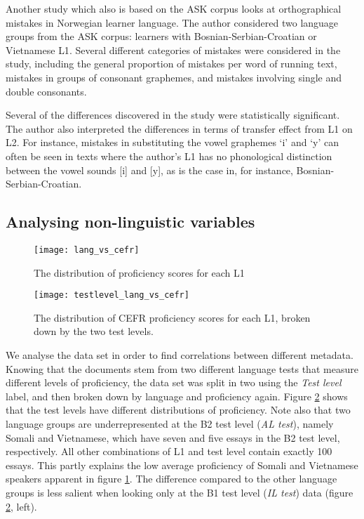 Another study \autocite{vigrestad2016} which also is based on the ASK corpus
looks at orthographical mistakes in Norwegian learner language. The author
considered two language groups from the ASK corpus: learners with
Bosnian-Serbian-Croatian or Vietnamese \ac{L1}. Several different categories
of mistakes were considered in the study, including the general proportion of
mistakes per word of running text, mistakes in groups of consonant graphemes,
and mistakes involving single and double consonants.

Several of the differences discovered in the study were statistically
significant. The author also interpreted the differences in terms of transfer
effect from \ac{L1} on \ac{L2}. For instance, mistakes in substituting the
vowel graphemes `i' and `y' can often be seen in texts where the author's L1
has no phonological distinction between the vowel sounds [i] and [y], as is
the case in, for instance, Bosnian-Serbian-Croatian.


\subsection{Analysing non-linguistic variables}

\begin{figure}
  \centering
  \texttt{[image: lang\_vs\_cefr]}
  \caption{The distribution of proficiency scores for each L1}
  \label{fig:lang-vs-cefr}
\end{figure}
 
\begin{figure}
  \centering
  \texttt{[image: testlevel\_lang\_vs\_cefr]}
  \caption[L1 versus CEFR score for each test level]{
    The distribution of CEFR proficiency scores for each L1, broken down by
    the two test levels.
  }
  \label{fig:testlevel-lang-vs-cefr}
\end{figure}

We analyse the data set in order to find correlations between different
metadata. Knowing that the documents stem from two different language tests
that measure different levels of proficiency, the data set was split in two
using the \emph{Test level} label, and then broken down by language and
proficiency again. Figure \ref{fig:testlevel-lang-vs-cefr} shows that the
test levels have different distributions of proficiency. Note also that two
language groups are underrepresented at the B2 test level (\emph{AL test}),
namely Somali and Vietnamese, which have seven and five essays in the B2 test
level, respectively. All other combinations of L1 and test level contain
exactly 100 essays. This partly explains the low average proficiency of
Somali and Vietnamese speakers apparent in figure \ref{fig:lang-vs-cefr}. The
difference compared to the other language groups is less salient when looking
only at the B1 test level (\emph{IL test}) data (figure
\ref{fig:testlevel-lang-vs-cefr}, left).

